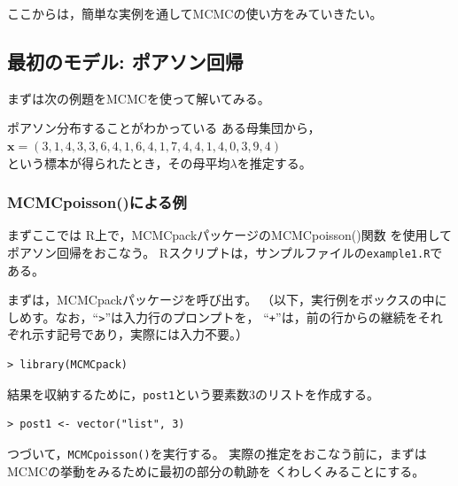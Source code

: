 \documentclass[11pt,uplatex]{jsarticle}
\begin{document}
ここからは，簡単な実例を通してMCMCの使い方をみていきたい。

\subsection{最初のモデル: ポアソン回帰}

まずは次の例題をMCMCを使って解いてみる。

\vspace{1zw}

\hspace{18mm}
\begin{minipage}{100mm}
\begin{breakbox}
ポアソン分布することがわかっている ある母集団から，\\
\hspace{10mm} $\bm{x} = (3, 1, 4, 3, 3, 6, 4, 1, 6, 4, 
       1, 7, 4, 4, 1, 4, 0, 3, 9, 4)$\\
という標本が得られたとき，その母平均$\lambda$を推定する。
\end{breakbox}
\end{minipage}

\vspace{1zw}

\subsubsection{MCMCpoisson()による例}

まずここでは \textsf{R}上で，\textsf{MCMCpack}パッケージの\textsf{MCMCpoisson()}関数
を使用してポアソン回帰をおこなう。
\textsf{R}スクリプトは，サンプルファイルの\texttt{example1.R}である。
\vspace{1zw}

まずは，\textsf{MCMCpack}パッケージを呼び出す。
（以下，実行例をボックスの中にしめす。なお，``\texttt{>}''は入力行のプロンプトを，
``\texttt{+}''は，前の行からの継続をそれぞれ示す記号であり，実際には入力不要。）

\begin{lstlisting}
> library(MCMCpack)
\end{lstlisting}
%
結果を収納するために，\texttt{post1}という要素数3のリストを作成する。

\begin{lstlisting}
> post1 <- vector("list", 3)
\end{lstlisting}
%
つづいて，\texttt{MCMCpoisson()}を実行する。
実際の推定をおこなう前に，まずはMCMCの挙動をみるために最初の部分の軌跡を
くわしくみることにする。
\end{document}
